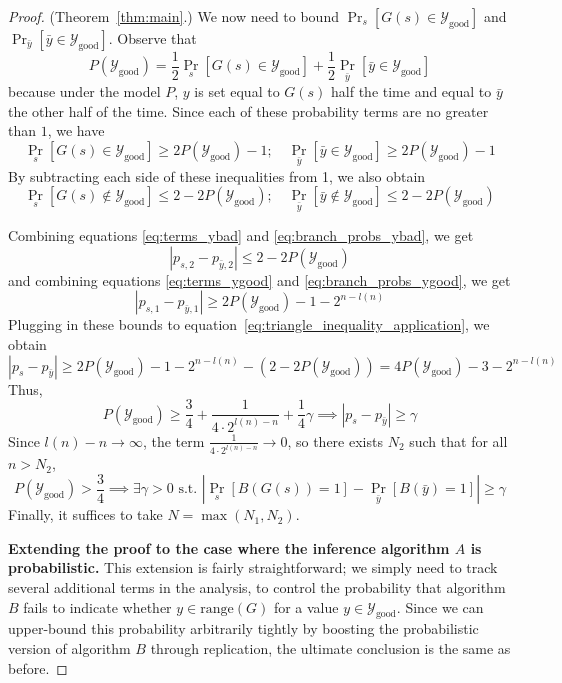 \documentclass{article}
\def \Ygood{\mathcal{Y}_\text{good}}
\def \by{{\bar{y}}}
\theoremstyle{definition}
\theoremstyle{remark}
\begin{document}
\begin{proof}{(Theorem~\ref{thm:main}.)}
We now need to bound $\Pr_s[G(s) \in \Ygood]$ and $\Pr_\by[\by \in \Ygood]$.
Observe that
$$
P(\Ygood) = \frac{1}{2}\Pr_s[G(s) \in \Ygood] + \frac{1}{2}\Pr_\by[\by \in \Ygood]
$$
because under the model $P$, $y$ is set equal to $G(s)$ half the time and equal to $\by$ the other half of the time.
Since each of these probability terms are no greater than $1$, we have
\begin{equation} \label{eq:branch_probs_ygood}
\Pr_s[G(s) \in \Ygood] \geq 2P(\Ygood) - 1;
\quad
\Pr_\by[\by \in \Ygood] \geq 2P(\Ygood) - 1        
\end{equation}
By subtracting each side of these inequalities from 1, we also obtain
\begin{equation} \label{eq:branch_probs_ybad}
\Pr_s[G(s) \notin \Ygood] \leq 2 - 2P(\Ygood);
\quad
\Pr_\by[\by \notin \Ygood] \leq 2 - 2P(\Ygood)
\end{equation}

Combining equations \ref{eq:terms_ybad} and \ref{eq:branch_probs_ybad}, we get
\begin{equation}
|p_{s, 2} - p_{\by, 2}| \leq 2 - 2P(\Ygood)    
\end{equation}
and combining equations \ref{eq:terms_ygood} and \ref{eq:branch_probs_ygood}, we get
\begin{equation} \label{eq:term1s_err_bound}
|p_{s, 1} - p_{\by, 1}| \geq 2P(\Ygood) - 1 - 2^{n - l(n)}    
\end{equation}
Plugging in these bounds to equation~\ref{eq:triangle_inequality_application}, we obtain
\begin{equation} \label{eq:final_ps_py_bound}
|p_s - p_\by| \geq
2P(\Ygood) - 1 - 2^{n - l(n)}
- (2 - 2P(\Ygood))
= 4 P(\Ygood) - 3 - 2^{n - l(n)}
\end{equation}
Thus, 
$$
P(\Ygood) \geq \frac{3}{4} + \frac{1}{4 \cdot 2^{l(n) - n}} + \frac{1}{4}\gamma
\implies |p_s - p_\by| \geq \gamma
$$
Since $l(n) - n \to \infty$, the term $\frac{1}{4 \cdot 2^{l(n) - n}} \to 0$,
so there exists $N_2$ such that for all $n > N_2$,
$$
P(\Ygood) > \frac{3}{4} \implies \exists \gamma > 0 \text{ s.t. } |\Pr_s[B(G(s)) = 1] - \Pr_{\bar{y}}[B(\bar{y}) = 1]| \geq \gamma
$$
Finally, it suffices to take $N = \max(N_1, N_2)$.

\medskip
\noindent
\textbf{Extending the proof to the case where the inference algorithm $A$ is probabilistic.}
This extension is fairly straightforward; we simply need to track several additional terms in the analysis, to control the probability that algorithm $B$ fails to indicate whether $y \in \text{range}(G)$ for a value $y \in \Ygood$.
Since we can upper-bound this probability arbitrarily tightly by boosting the probabilistic version of algorithm $B$ through replication, the ultimate conclusion is the same as before.


\end{proof}
\end{document}
